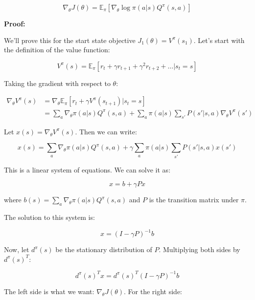 \documentclass{article}
\begin{document}
\begin{equation}
    \nabla_\theta J(\theta) = \mathbb{E}_\pi[\nabla_\theta \log \pi(a|s) Q^\pi(s,a)]
\end{equation}

\textbf{Proof:}

We'll prove this for the start state objective $J_1(\theta) = V^\pi(s_1)$. Let's start with the definition of the value function:

\begin{equation}
    V^\pi(s) = \mathbb{E}_\pi[r_t + \gamma r_{t+1} + \gamma^2 r_{t+2} + ... | s_t = s]
\end{equation}

Taking the gradient with respect to $\theta$:

\begin{align}
    \nabla_\theta V^\pi(s) &= \nabla_\theta \mathbb{E}_\pi[r_t + \gamma V^\pi(s_{t+1}) | s_t = s] \\
    &= \sum_a \nabla_\theta \pi(a|s)Q^\pi(s,a) + \sum_a \pi(a|s)\sum_{s'} P(s'|s,a)\nabla_\theta V^\pi(s')
\end{align}

Let $x(s) = \nabla_\theta V^\pi(s)$. Then we can write:

\begin{equation}
    x(s) = \sum_a \nabla_\theta \pi(a|s)Q^\pi(s,a) + \gamma\sum_a \pi(a|s)\sum_{s'} P(s'|s,a)x(s')
\end{equation}

This is a linear system of equations. We can solve it as:

\begin{equation}
    x = b + \gamma Px
\end{equation}

where $b(s) = \sum_a \nabla_\theta \pi(a|s)Q^\pi(s,a)$ and $P$ is the transition matrix under $\pi$.

The solution to this system is:

\begin{equation}
    x = (I - \gamma P)^{-1}b
\end{equation}

Now, let $d^\pi(s)$ be the stationary distribution of $P$. Multiplying both sides by $d^\pi(s)^T$:

\begin{equation}
    d^\pi(s)^T x = d^\pi(s)^T (I - \gamma P)^{-1}b
\end{equation}

The left side is what we want: $\nabla_\theta J(\theta)$. For the right side:
\end{document}
